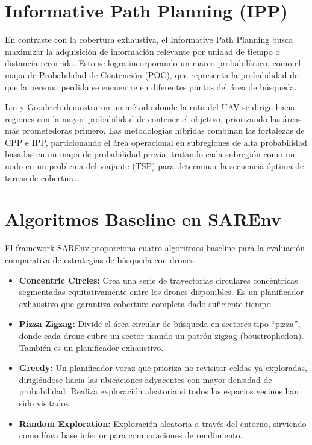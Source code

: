 \documentclass[12pt]{report} %
\begin{document}
\section{Informative Path Planning (IPP)}

En contraste con la cobertura exhaustiva, el Informative Path Planning busca maximizar la adquisición de información relevante por unidad de tiempo o distancia recorrida\cite{rossello2022, bai2021}. Esto se logra incorporando un marco probabilístico, como el mapa de Probabilidad de Contención (POC), que representa la probabilidad de que la persona perdida se encuentre en diferentes puntos del área de búsqueda.

Lin y Goodrich\cite{lin2009, lin2010} demostraron un método donde la ruta del UAV se dirige hacia regiones con la mayor probabilidad de contener el objetivo, priorizando las áreas más prometedoras primero. Las metodologías híbridas combinan las fortalezas de CPP e IPP, particionando el área operacional en subregiones de alta probabilidad basadas en un mapa de probabilidad previa, tratando cada subregión como un nodo en un problema del viajante (TSP) para determinar la secuencia óptima de tareas de cobertura\cite{vasquez2018}.

\section{Algoritmos Baseline en SAREnv}

El framework SAREnv\cite{grontved2025} proporciona cuatro algoritmos baseline para la evaluación comparativa de estrategias de búsqueda con drones:

\begin{itemize}
	\item \textbf{Concentric Circles:} Crea una serie de trayectorias circulares concéntricas segmentadas equitativamente entre los drones disponibles. Es un planificador exhaustivo que garantiza cobertura completa dado suficiente tiempo.
	\item \textbf{Pizza Zigzag:} Divide el área circular de búsqueda en sectores tipo ``pizza'', donde cada drone cubre un sector usando un patrón zigzag (boustrophedon). También es un planificador exhaustivo.
	\item \textbf{Greedy:} Un planificador voraz que prioriza no revisitar celdas ya exploradas, dirigiéndose hacia las ubicaciones adyacentes con mayor densidad de probabilidad. Realiza exploración aleatoria si todos los espacios vecinos han sido visitados.
	\item \textbf{Random Exploration:} Exploración aleatoria a través del entorno, sirviendo como línea base inferior para comparaciones de rendimiento.
\end{itemize}
\end{document}
